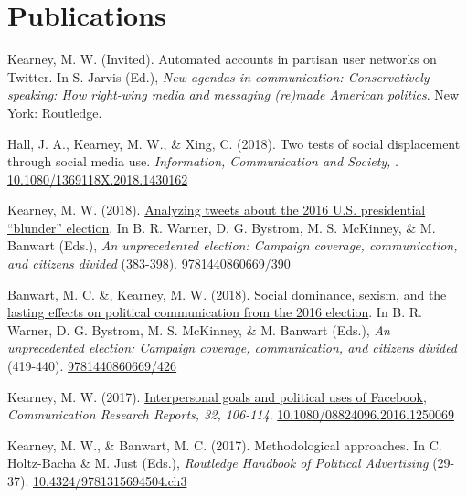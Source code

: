 
\section{Publications}

\begin{bibenum}

\item Kearney, M. W. (Invited).
Automated accounts in partisan user networks on Twitter.
In S. Jarvis (Ed.),
\textit{New agendas in communication: Conservatively speaking: How right-wing media and messaging (re)made American politics}. New York: Routledge.

\item Hall, J. A., Kearney, M. W., \& Xing, C. (2018).
Two tests of social displacement through social media use.
\textit{Information, Communication and Society, }.
\href{https://doi.org/10.1080/1369118X.2018.1430162}{10.1080/1369118X.2018.1430162}

\item Kearney, M. W. (2018).
\href{https://books.google.com/books?hl=en&lr=&id=CtVJDwAAQBAJ&oi=fnd&pg=PA383}{Analyzing tweets about the 2016 U.S. presidential ``blunder'' election}.
In B. R. Warner, D. G. Bystrom, M. S. McKinney, \& M. Banwart (Eds.),
\textit{An unprecedented election: Campaign coverage, communication, and citizens divided} (383-398).
\href{http://publisher.abc-clio.com/9781440860669/390}{9781440860669/390}

\item Banwart, M. C. \&, Kearney, M. W. (2018).
\href{https://books.google.com/books?hl=en&lr=&id=CtVJDwAAQBAJ&oi=fnd&pg=PA419}{Social dominance, sexism, and the lasting effects on political communication from the 2016 election}.
In B. R. Warner, D. G. Bystrom, M. S. McKinney, \& M. Banwart (Eds.),
\textit{An unprecedented election: Campaign coverage, communication, and citizens divided} (419-440).
\href{http://publisher.abc-clio.com/9781440860669/426}{9781440860669/426}

\item Kearney, M. W. (2017).
\href{http://www.tandfonline.com/doi/abs/10.1080/08824096.2016.1250069}{Interpersonal goals and political uses of Facebook},
\textit{Communication Research Reports, 32, 106-114}.
\href{https://doi.org/10.1080/08824096.2016.1250069}{10.1080/08824096.2016.1250069}

\item[] Kearney, M. W., \& Banwart, M. C. (2017).
Methodological approaches.
In C. Holtz-Bacha \& M. Just (Eds.),
\textit{Routledge Handbook of Political Advertising} (29-37).
\href{https://www.routledgehandbooks.com/doi/10.4324/9781315694504.ch3}{10.4324/9781315694504.ch3}


\end{bibenum}
